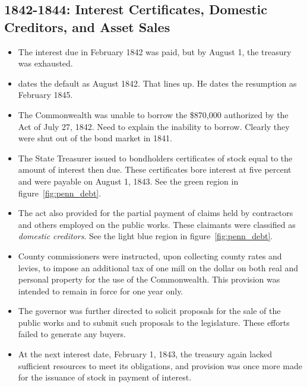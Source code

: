 \documentclass[11pt]{article}
\begin{document}
\subsection{1842-1844: Interest Certificates, Domestic Creditors, and Asset Sales}

\begin{itemize}

\item The interest due in February 1842 was paid, but by August 1, 
the treasury was exhausted.

\item \cite{English_1996} dates the default as August 1842.  That lines up.  
He dates the resumption as February 1845.
 
\item The Commonwealth was unable to borrow the \$870,000 authorized by the 
Act of July 27, 1842. Need to explain the inability to borrow.  
Clearly they were shut out of the bond market in 1841.

\item The State Treasurer issued to bondholders certificates of stock equal 
to the amount of interest then due. These certificates bore interest at five 
percent and were payable on August 1, 1843.  See the green region in 
figure~\ref{fig:penn_debt}.

\item The act also provided for the partial payment of claims held by 
contractors and others employed on the public works. These claimants were 
classified as \emph{domestic creditors}.  See the light blue region in 
figure~\ref{fig:penn_debt}.

\item County commissioners were instructed, upon collecting county rates and 
levies, to impose an additional tax of one mill on the dollar on both real 
and personal property for the use of the Commonwealth. This provision was 
intended to remain in force for one year only.

\item The governor was further directed to solicit proposals for the sale of 
the public works and to submit such proposals to the legislature. These 
efforts failed to generate any buyers.

\item At the next interest date, February 1, 1843, the treasury again lacked 
sufficient resources to meet its obligations, and provision was once more 
made for the issuance of stock in payment of interest.


\end{itemize}
\end{document}
